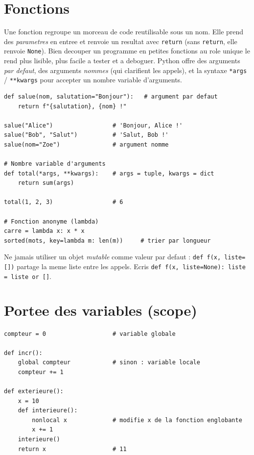 \documentclass[11pt,a4paper]{article}
\begin{document}
\section{Fonctions}
Une fonction regroupe un morceau de code reutilisable sous un nom. Elle prend des
\emph{parametres} en entree et renvoie un resultat avec \texttt{return} (sans
\texttt{return}, elle renvoie \texttt{None}). Bien decouper un programme en
petites fonctions au role unique le rend plus lisible, plus facile a tester et a
deboguer. Python offre des arguments \emph{par defaut}, des arguments
\emph{nommes} (qui clarifient les appels), et la syntaxe \texttt{*args} /
\texttt{**kwargs} pour accepter un nombre variable d'arguments.

\begin{lstlisting}
def salue(nom, salutation="Bonjour"):   # argument par defaut
    return f"{salutation}, {nom} !"

salue("Alice")                 # 'Bonjour, Alice !'
salue("Bob", "Salut")          # 'Salut, Bob !'
salue(nom="Zoe")               # argument nomme

# Nombre variable d'arguments
def total(*args, **kwargs):    # args = tuple, kwargs = dict
    return sum(args)

total(1, 2, 3)                 # 6

# Fonction anonyme (lambda)
carre = lambda x: x * x
sorted(mots, key=lambda m: len(m))     # trier par longueur
\end{lstlisting}

\begin{piege}
Ne jamais utiliser un objet \emph{mutable} comme valeur par defaut :
\texttt{def f(x, liste=[])} partage la meme liste entre les appels. Ecris
\texttt{def f(x, liste=None): liste = liste or []}.
\end{piege}

\section{Portee des variables (scope)}
\begin{lstlisting}
compteur = 0                   # variable globale

def incr():
    global compteur            # sinon : variable locale
    compteur += 1

def exterieure():
    x = 10
    def interieure():
        nonlocal x             # modifie x de la fonction englobante
        x += 1
    interieure()
    return x                   # 11
\end{lstlisting}
\end{document}
